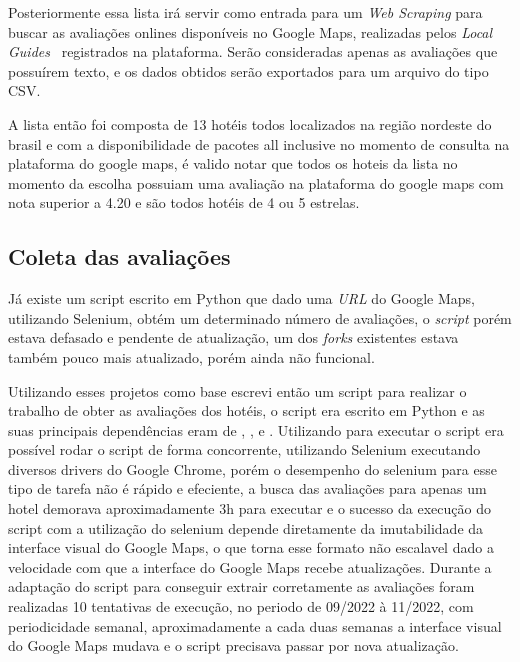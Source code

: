 Posteriormente essa lista irá servir como entrada para um \emph{Web Scraping} para buscar as avaliações onlines disponíveis no Google Maps, realizadas pelos \emph{Local Guides}~\cite{google2022localguides} registrados na plataforma. Serão consideradas apenas as avaliações que possuírem texto, e os dados obtidos serão exportados para um arquivo do tipo CSV.

A lista então foi composta de 13 hotéis todos localizados na região nordeste do brasil e com a disponibilidade de pacotes all inclusive no momento de consulta na plataforma do google maps, é valido notar que todos os hoteis da lista no momento da escolha possuiam uma avaliação na plataforma do google maps com nota superior a 4.20 e são todos hotéis de 4 ou 5 estrelas.

\subsection{Coleta das avaliações}
\label{cap:metodologia:sec:conjunto_dados:sec:coleta}

Já existe um script escrito em Python \cite{gaspa93scrapper2023} que dado uma \emph{URL} do Google Maps, utilizando Selenium, obtém um determinado número de avaliações, o \emph{script} porém estava defasado e pendente de atualização, um dos \emph{forks} existentes  estava também pouco mais atualizado, porém ainda não funcional.

Utilizando esses projetos como base escrevi então um script para realizar o trabalho de obter as avaliações dos hotéis, o script era escrito em Python e as suas principais dependências eram de \cite{selenium2023}, ,  e . Utilizando  para executar o script era possível rodar o script de forma concorrente, utilizando Selenium executando diversos drivers do Google Chrome, porém o desempenho do selenium para esse tipo de tarefa não é rápido e efeciente, a busca das avaliações para apenas um hotel demorava aproximadamente 3h para executar e o sucesso da execução do script com a utilização do selenium depende diretamente da imutabilidade da interface visual do Google Maps, o que torna esse formato não escalavel dado a velocidade com que a interface do Google Maps recebe atualizações. Durante a adaptação do script para conseguir extrair corretamente as avaliações foram realizadas 10 tentativas de execução, no periodo de 09/2022 à 11/2022, com periodicidade semanal, aproximadamente a cada duas semanas a interface visual do Google Maps mudava e o script precisava passar por nova atualização.

